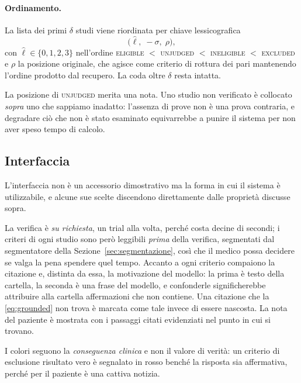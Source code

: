 \documentclass[pdflatex,sn-mathphys-num]{sn-jnl}
\theoremstyle{thmstyleone}
\theoremstyle{thmstyletwo}
\theoremstyle{thmstylethree}
\begin{document}
\paragraph{Ordinamento.} La lista dei primi $\delta$ studi viene riordinata per chiave lessicografica
\begin{equation}
  \big(\hat{\ell},\; -\sigma,\; \rho\big),
  \label{eq:ordinamento}
\end{equation}
con $\hat{\ell} \in \{0,1,2,3\}$ nell'ordine \textsc{eligible} $<$ \textsc{unjudged} $<$ \textsc{ineligible} $<$ \textsc{excluded} e $\rho$ la posizione originale, che agisce come criterio di rottura dei pari mantenendo l'ordine prodotto dal recupero. La coda oltre $\delta$ resta intatta.

La posizione di \textsc{unjudged} merita una nota. Uno studio non verificato è collocato \emph{sopra} uno che sappiamo inadatto: l'assenza di prove non è una prova contraria, e degradare ciò che non è stato esaminato equivarrebbe a punire il sistema per non aver speso tempo di calcolo.

\subsection{Interfaccia}\label{sec:interfaccia}

L'interfaccia non è un accessorio dimostrativo ma la forma in cui il sistema è utilizzabile, e alcune sue scelte discendono direttamente dalle proprietà discusse sopra.

La verifica è \emph{su richiesta}, un trial alla volta, perché costa decine di secondi; i criteri di ogni studio sono però leggibili \emph{prima} della verifica, segmentati dal segmentatore della Sezione~\ref{sec:segmentazione}, così che il medico possa decidere se valga la pena spendere quel tempo. Accanto a ogni criterio compaiono la citazione e, distinta da essa, la motivazione del modello: la prima è testo della cartella, la seconda è una frase del modello, e confonderle significherebbe attribuire alla cartella affermazioni che non contiene. Una citazione che la \eqref{eq:grounded} non trova è marcata come tale invece di essere nascosta. La nota del paziente è mostrata con i passaggi citati evidenziati nel punto in cui si trovano.

I colori seguono la \emph{conseguenza clinica} e non il valore di verità: un criterio di esclusione risultato vero è segnalato in rosso benché la risposta sia affermativa, perché per il paziente è una cattiva notizia.
\end{document}
